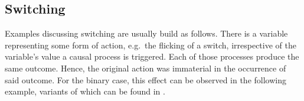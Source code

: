 \documentclass[11pt,a4paper]{book}
\theoremstyle{definition}
\theoremstyle{definition}
\theoremstyle{definition}
\theoremstyle{remark}
\begin{document}





%



\subsection{Switching}
%
%
%
%
Examples discussing switching are usually build as follows. There is a variable representing some form of action, e.g.\ the flicking of a switch, irrespective of the variable's value
a causal process is triggered. Each of those processes produce the same outcome. Hence, the original action was immaterial in the occurrence of said outcome.
For the binary case, this effect can be observed in the following example, variants of which can be found in \parencite{glymour2010actual,halpern2011actual,baumgartner2013regularity,weslake2015partial,bochman2018actual,beckers2018principled,denecker2018causal,batusov2018situation,denecker2019explaining}. 
\end{document}
